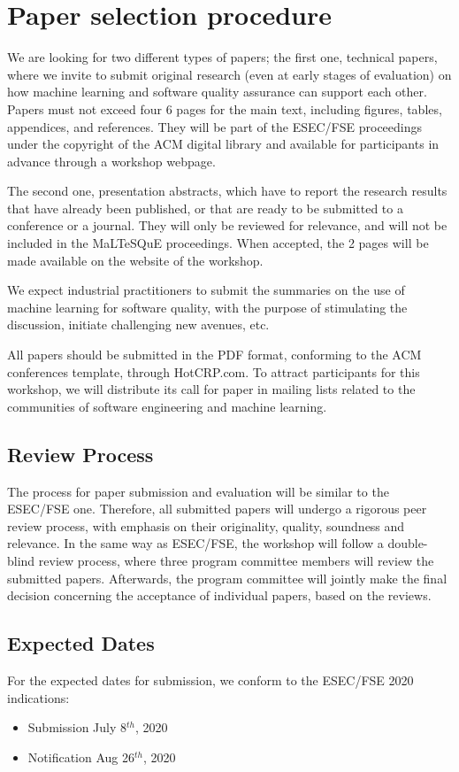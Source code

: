 \section{Paper selection procedure}
\label{sec:submissions}

We are looking for two different types of papers; the first one, \ie technical papers, where we invite to submit original research (even at early stages of evaluation) on how machine learning and software quality assurance can support each other.
Papers must not exceed four 6 pages for the main text, including figures, tables, appendices, and references.
They will be part of the ESEC/FSE proceedings under the copyright of the ACM digital library and available for participants in advance through a workshop webpage.

The second one, \ie presentation abstracts, which have to report the research results that have already been published, or that are ready to be submitted to a conference or a journal.
They will only be reviewed for relevance, and will not be included in the MaLTeSQuE proceedings.
When accepted, the 2 pages will be made available on the website of the workshop.

We expect industrial practitioners to submit the summaries on the use of machine learning for software quality, with the purpose of stimulating the discussion, initiate challenging new avenues, etc.

All papers should be submitted in the PDF format, conforming to the ACM conferences template, through HotCRP.com.
To attract participants for this workshop, we will distribute its call for paper in mailing lists related to the communities of software engineering and machine learning.

\subsection{Review Process}
The process for paper submission and evaluation will be similar to the ESEC/FSE one.
Therefore, all submitted papers will undergo a rigorous peer review process, with emphasis on their originality, quality, soundness and relevance.
In the same way as ESEC/FSE, the workshop will follow a double-blind review process, where three program committee members will review the submitted papers.
Afterwards, the program committee will jointly make the final decision concerning the acceptance of individual papers, based on the reviews.

\subsection{Expected Dates}
For the expected dates for submission, we conform to the ESEC/FSE 2020 indications:
\begin{itemize}[itemsep=0.5em]
	\item Submission July 8$^{th}$, 2020
	\item Notification Aug 26$^{th}$, 2020
\end{itemize}


